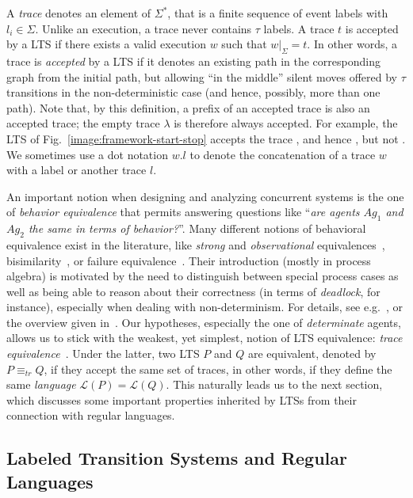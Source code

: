 A \emph{trace} denotes an element of $\Sigma^*$, that is a finite sequence of event labels  with $l_i \in \Sigma$. Unlike an execution, a trace never contains $\tau$ labels. A trace $t$ is accepted by a LTS if there exists a valid execution $w$ such that $w|_{\Sigma} = t$. In other words, a trace is \emph{accepted} by a LTS if it denotes an existing path in the corresponding graph from the initial path, but allowing ``in the middle'' silent moves offered by $\tau$ transitions in the non-deterministic case (and hence, possibly, more than one path). Note that, by this definition, a prefix of an accepted trace is also an accepted trace; the empty trace $\lambda$ is therefore always accepted. For example, the LTS of Fig.~\ref{image:framework-start-stop} accepts the trace , and hence , but not . We sometimes use a dot notation $w.l$ to denote the concatenation of a trace $w$ with a label or another trace $l$.

An important notion when designing and analyzing concurrent systems is the one of \emph{behavior equivalence} that permits answering questions like ``\emph{are agents $Ag_1$ and $Ag_2$ the same in terms of behavior?}''. Many different notions of behavioral equivalence exist in the literature, like \emph{strong} and \emph{observational}  equivalences~\cite{Milner:1989}, bisimilarity~\cite{Park:1981}, or failure equivalence~\cite{Hoare:1985}. Their introduction (mostly in process algebra) is motivated by the need to distinguish between special process cases as well as being able to reason about their correctness (in terms of \emph{deadlock}, for instance), especially when dealing with non-determinism. For details, see e.g.~\cite[chap. 3]{Hoare:1985}, \cite[chap. 4 \& 5]{Milner:1989} or the overview given in~\cite{Fernandez:1991}. Our hypotheses, especially the one of \emph{determinate} agents, allows us to stick with the weakest, yet simplest, notion of LTS equivalence: \emph{trace equivalence}~\cite{Hoare:1985, Engelfriet:1985}. Under the latter, two LTS $P$ and $Q$ are equivalent, denoted by $P \equiv_{tr} Q$, if they accept the same set of traces, in other words, if they define the same \emph{language} $\mathcal{L}(P) = \mathcal{L}(Q)$. This naturally leads us to the next section, which discusses some important properties inherited by LTSs from their connection with regular languages. 

\subsection{Labeled Transition Systems and Regular Languages\label{section:background-lts-and-regular-languages}}

